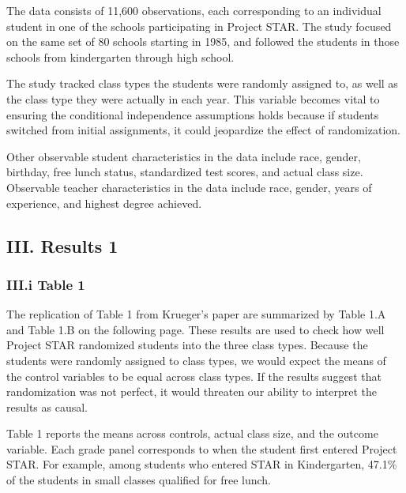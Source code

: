 \documentclass[a4paper,11pt]{article}
\begin{document}
The data consists of 11,600 observations, each corresponding to an individual student in one of the schools participating in Project STAR. The study focused on the same set of 80 schools  starting in 1985, and followed the students in those schools from kindergarten through high school. \par

The study tracked class types the students were randomly assigned to, as well as the class type they were actually in each year. This variable becomes vital to ensuring the conditional independence assumptions holds because if students switched from initial assignments, it could jeopardize the effect of randomization. \par

Other observable student characteristics in the data include race, gender, birthday, free lunch status, standardized test scores, and actual class size. Observable teacher characteristics in the data include race, gender, years of experience, and highest degree achieved.\\


\subsection*{III. Results 1}

\subsubsection*{III.i Table 1}
The replication of Table 1 from Krueger's paper are summarized by Table 1.A and Table 1.B on the following page. These results are used to check how well Project STAR randomized students into the three class types. Because the students were randomly assigned to class types, we would expect the means of the control variables to be equal across class types. If the results suggest that randomization was not perfect, it would threaten our ability to interpret the results as causal.
 \par

Table 1 reports the means  across controls, actual class size, and the outcome variable. Each grade panel corresponds to when the student first entered Project STAR. For example, among students who entered STAR in Kindergarten, 47.1\% of the students in small classes qualified for free lunch. \par
\end{document}
